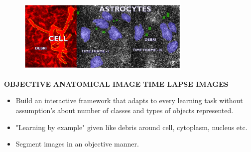 \documentclass[portrait,final,a0paper]{baposter}
\begin{document}
\begin{poster}
{\begin{minipage}{.30\textwidth}
		\end{minipage} 
		\begin{minipage}{.70\textwidth}
			\includegraphics[width=10.5cm, height=3.5cm ]{MONTAGE31}
		\end{minipage}
	\newline 	
	\textbf{OBJECTIVE} 	\color{primary1}\hspace{2.7cm}\textbf{ANATOMICAL IMAGE }	 \hspace{1.2cm}\textbf{TIME LAPSE IMAGES}	
	\color{black}
	\begin{itemize}
		\item Build an interactive framework that adapts to every learning task without assumption's  about number of classes and types of objects represented.
		\item "Learning by example" given like  \color{primary1}debris around cell, \color{secondary1}cytoplasm, \color{primary1}nucleus \color{black} etc.		
     	\item Segment images in an objective manner.
	\end{itemize}	
}


\end{poster}
\end{document}
